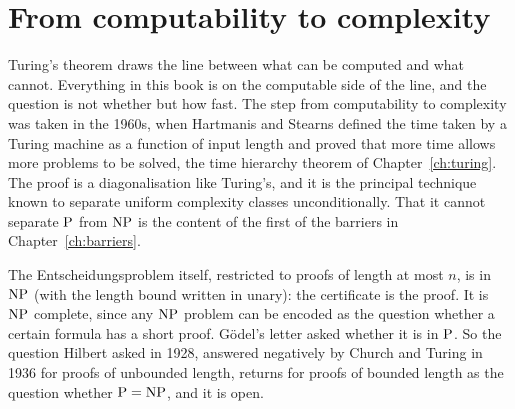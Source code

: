 \section{From computability to complexity}

Turing's theorem draws the line between what can be computed and what cannot. Everything in this book is on the computable side of the line, and the question is not whether but how fast. The step from computability to complexity was taken in the 1960s, when Hartmanis and Stearns defined the time taken by a Turing machine as a function of input length and proved that more time allows more problems to be solved, the time hierarchy theorem of Chapter~\ref{ch:turing}. The proof is a diagonalisation like Turing's, and it is the principal technique known to separate uniform complexity classes unconditionally. That it cannot separate $\mathrm{P}$ from $\mathrm{NP}$ is the content of the first of the barriers in Chapter~\ref{ch:barriers}.

The Entscheidungsproblem itself, restricted to proofs of length at most $n$, is in $\mathrm{NP}$ (with the length bound written in unary): the certificate is the proof. It is $\mathrm{NP}$ complete, since any $\mathrm{NP}$ problem can be encoded as the question whether a certain formula has a short proof. G\"odel's letter asked whether it is in $\mathrm{P}$. So the question Hilbert asked in 1928, answered negatively by Church and Turing in 1936 for proofs of unbounded length, returns for proofs of bounded length as the question whether $\mathrm{P} = \mathrm{NP}$, and it is open.
